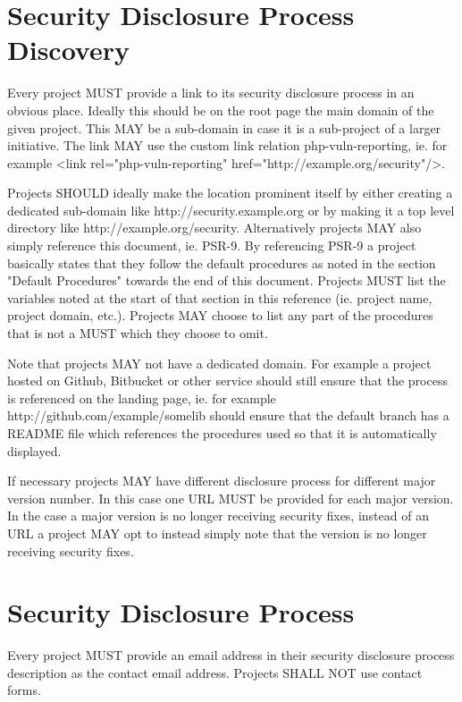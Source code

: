 \section{Security Disclosure Process Discovery}

Every project MUST provide a link to its security disclosure process in an obvious place. Ideally this should be on the root page the main domain of the given project. This MAY be a sub-domain in case it is a sub-project of a larger initiative. The link MAY use the custom link relation php-vuln-reporting, ie. for example <link rel="php-vuln-reporting" href="http://example.org/security"/>.

Projects SHOULD ideally make the location prominent itself by either creating a dedicated sub-domain like http://security.example.org or by making it a top level directory like http://example.org/security. Alternatively projects MAY also simply reference this document, ie. PSR-9. By referencing PSR-9 a project basically states that they follow the default procedures as noted in the section "Default Procedures" towards the end of this document. Projects MUST list the variables noted at the start of that section in this reference (ie. project name, project domain, etc.). Projects MAY choose to list any part of the procedures that is not a MUST which they choose to omit.

Note that projects MAY not have a dedicated domain. For example a project hosted on Github, Bitbucket or other service should still ensure that the process is referenced on the landing page, ie. for example http://github.com/example/somelib should ensure that the default branch has a README file which references the procedures used so that it is automatically displayed.

If necessary projects MAY have different disclosure process for different major version number. In this case one URL MUST be provided for each major version. In the case a major version is no longer receiving security fixes, instead of an URL a project MAY opt to instead simply note that the version is no longer receiving security fixes.


\section{Security Disclosure Process}


Every project MUST provide an email address in their security disclosure process description as the contact email address. Projects SHALL NOT use contact forms.

